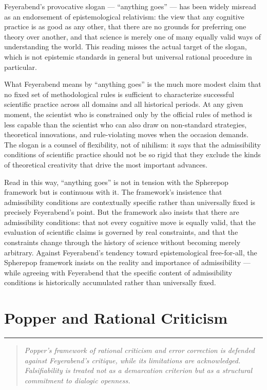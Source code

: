 \documentclass[12pt,openany]{book}
\theoremstyle{plain}
\theoremstyle{definition}
\theoremstyle{remark}
\newcommand{\chapterrule}{%
  \vspace{4pt}%
  {\color{SpherepopBlue}\rule{\textwidth}{0.8pt}}%
  \vspace{10pt}%
}
\newenvironment{chapterprecis}{%
  \begin{quote}\small\itshape}{%
  \end{quote}\medskip}
\begin{document}
Feyerabend's provocative slogan — \enquote{anything goes} — has been widely misread as an endorsement of epistemological relativism: the view that any cognitive practice is as good as any other, that there are no grounds for preferring one theory over another, and that science is merely one of many equally valid ways of understanding the world. This reading misses the actual target of the slogan, which is not epistemic standards in general but universal rational procedure in particular.

What Feyerabend means by \enquote{anything goes} is the much more modest claim that no fixed set of methodological rules is sufficient to characterize successful scientific practice across all domains and all historical periods. At any given moment, the scientist who is constrained only by the official rules of method is less capable than the scientist who can also draw on non-standard strategies, theoretical innovations, and rule-violating moves when the occasion demands. The slogan is a counsel of flexibility, not of nihilism: it says that the admissibility conditions of scientific practice should not be so rigid that they exclude the kinds of theoretical creativity that drive the most important advances.

Read in this way, \enquote{anything goes} is not in tension with the Spherepop framework but is continuous with it. The framework's insistence that admissibility conditions are contextually specific rather than universally fixed is precisely Feyerabend's point. But the framework also insists that there are admissibility conditions: that not every cognitive move is equally valid, that the evaluation of scientific claims is governed by real constraints, and that the constraints change through the history of science without becoming merely arbitrary. Against Feyerabend's tendency toward epistemological free-for-all, the Spherepop framework insists on the reality and importance of admissibility — while agreeing with Feyerabend that the specific content of admissibility conditions is historically accumulated rather than universally fixed.

\chapter{Popper and Rational Criticism}
\chapterrule

\begin{chapterprecis}
Popper's framework of rational criticism and error correction is
defended against Feyerabend's critique, while its limitations
are acknowledged. Falsifiability is treated not as a demarcation
criterion but as a structural commitment to dialogic openness.
\end{chapterprecis}
\end{document}
